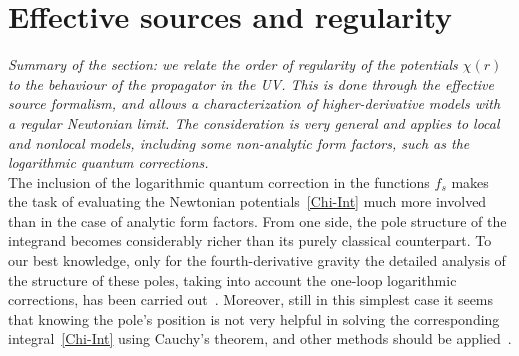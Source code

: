 \documentclass[aps,prd,a4paper,twocolumn,showpacs,showkeys,preprintnumbers,amsmath,amssymb,nofootinbib]{revtex4-2}
\renewcommand{\thesection}{\arabic{section}}
\numberwithin{equation}{section}
\let\oldsection\section%
\renewcommand{\section}{%
  \renewcommand{\theequation}{\thesection.\arabic{equation}}%
  \oldsection}%
\begin{document}

\section{Effective sources and regularity}
\label{source-gen}
\label{Sec5}

{\it 
Summary of the section: we relate the order of regularity of the potentials $\chi(r)$ to the behaviour of the propagator in the UV. This is done through the effective source formalism, and allows a characterization of higher-derivative models with a regular Newtonian limit. The consideration is very general and applies to local and nonlocal models, including some non-analytic form factors, such as the logarithmic quantum corrections.
}\\

 The inclusion of the logarithmic quantum correction in the functions $f_s$ makes the task of evaluating the Newtonian potentials~\eqref{Chi-Int} much more involved than in the case of analytic form factors. From one side, the pole structure of the integrand becomes considerably richer than its purely classical counterpart. To our best knowledge, only for the fourth-derivative gravity the detailed analysis of the structure of these poles, taking into account the one-loop logarithmic corrections, has been carried out~\cite{Calmet:2017omb}. Moreover, still in this simplest case it seems that knowing the pole's position is not very helpful in solving the corresponding integral~\eqref{Chi-Int} using Cauchy's theorem, and other methods should be applied~\cite{Nos4der}. 
\end{document}
